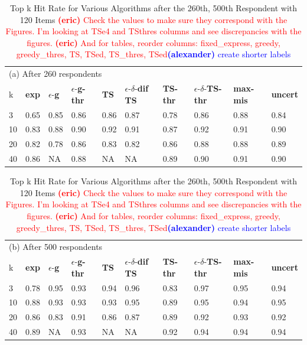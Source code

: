 \documentclass[nonblindrev]{informs3}
\newcommand{\alexander}[1]{\textcolor{blue}{\textbf{(alexander)} #1}}
\newcommand{\eric}[1]{\textcolor{red}{\textbf{(eric)} #1}}
\newcommand{\fixedexpressS}{\textbf{exp}}
\newcommand{\egreedyS}{$\epsilon$-\textbf{g}}
\newcommand{\egreedythresS}{$\epsilon$-\textbf{g-thr}}
\newcommand{\misminS}{\textbf{max-mis}}
\newcommand{\tsS}{\textbf{TS} }
\newcommand{\edtsS}{$\epsilon$-$\delta$-\textbf{dif TS} }
\newcommand{\tsthresS}{\textbf{TS-thr} }
\newcommand{\edtsthresS}{$\epsilon$-$\delta$-\textbf{TS-thr} }
\newcommand{\uncertS}{\textbf{uncert} }
\begin{document}
\begin{table}
\caption{Top k Hit Rate for Various Algorithms after the {260th, 500th} Respondent with 120 Items \eric{Check the values to make sure they correspond with the Figures. I'm looking at TSe4 and TSthres columns and see discrepancies with the figures.} \eric{And for tables, reorder columns: fixed\_express, greedy, greedy\_thres, TS, TSed, TS\_thres, TSed}\alexander{create shorter labels}
 }
\label{table:at_260_500}
\begin{center}
\begin{tabular}{llllllllll}
\hline 
\hline
\multicolumn{10}{l}{(a) After 260 respondents}\\
k &  \fixedexpressS&\egreedyS&\egreedythresS&\tsS&\edtsS&\tsthresS&\edtsthresS& \misminS& \uncertS \\ \hline
  3 & 0.65 &   0.85 &  0.86 &   0.86 & 0.87 & 0.78 & 0.86 &    0.88 &   0.84 \\
  10 &  0.83 &   0.88 & 0.90 &   0.92 & 0.91 & 0.87 & 0.92 &    0.91 &   0.90 \\
  20 & 0.82 & 0.78 &  0.86 & 0.83 & 0.82 & 0.86 & 0.88 &  0.88 &   0.89 \\  
  40 &  0.86 &   NA &  0.88 &  NA & NA & 0.89 & 0.90 &  0.91 &   0.90 \\
\hline
\hline
\end{tabular}
\begin{tabular}{llllllllll}
\multicolumn{10}{l}{(b) After 500 respondents}\\
k &  \fixedexpressS&\egreedyS&\egreedythresS&\tsS&\edtsS&\tsthresS&\edtsthresS& \misminS& \uncertS  \\
\hline
   3 & 0.78 &   0.95 & 0.93 & 0.94 & 0.96 & 0.83 & 0.97 &    0.95 &   0.94 \\
  10 &  0.88 &   0.93 &  0.93 &   0.93 & 0.95 & 0.89 & 0.95 &    0.94 &   0.95 \\  
  20 &  0.86 &   0.83 & 0.91 &  0.86 & 0.87 & 0.89 & 0.92 &  0.93 &   0.92 \\ 
  40 &  0.89 &   NA & 0.93 & NA & NA & 0.92 &  0.94 & 0.94 & 0.94 \\
\hline 
\hline
\end{tabular}
\end{center}
\end{table}
\end{document}

